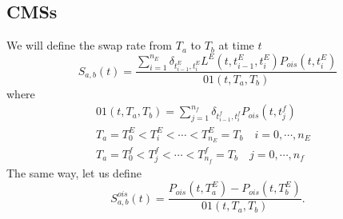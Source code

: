 \documentclass[a4paper,10pt]{article}
\newcommand{\1}{\mathbf{1}}
\begin{document}
\subsection{CMSs}
We will define the swap rate from $T_a$ to $T_b$ at time $t$
\begin{equation*}
S_{a,b}(t) = \frac{\sum_{i=1}^{n_E}\delta_{t^{E}_{i-1}, t^{E}_i} L^{E}(t,t^{E}_{i-1}, t^{E}_{i}) P_{ois}(t,t^{E}_{i})}{01(t,T_a,T_b)}
\end{equation*}
where
\begin{align*}
01(t,T_a,T_b) = \sum_{j=1}^{n_f} \delta_{t^{f}_{i-1}, t^{f}_i} P_{ois}(t,t^{f}_{j}) \\
T_a=T^{E}_0 < T^{E}_i< \cdots < T^{E}_{n_E}=T_b \quad i=0,\cdots,n_E&  \\
T_a=T^{f}_0 < T^{f}_j< \cdots < T^{f}_{n_f}=T_b \quad j=0,\cdots,n_f&
\end{align*}
The same way, let us define
\begin{equation*}
S^{ois}_{a,b}(t) = \frac{P_{ois}(t,T^{E}_a) - P_{ois}(t,T^{E}_b)}{01(t,T_a,T_b)}. 
\end{equation*}
\end{document}
